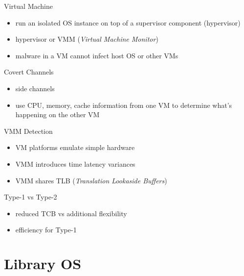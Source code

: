 \documentclass{curs}
\begin{document}
\begin{frame}{Virtual Machine}
  \begin{itemize}
    \item run an isolated OS instance on top of a supervisor component (hypervisor)
    \item hypervisor or VMM (\textit{Virtual Machine Monitor})
    \item malware in a VM cannot infect host OS or other VMs
  \end{itemize}
\end{frame}

\begin{frame}{Covert Channels}
  \begin{itemize}
    \item side channels
    \item use CPU, memory, cache information from one VM to determine what's happening on the other VM
  \end{itemize}
\end{frame}

\begin{frame}{VMM Detection}
  \begin{itemize}
    \item VM platforms emulate simple hardware
    \item VMM introduces time latency variances
    \item VMM shares TLB (\textit{Translation Lookaside Buffers})
  \end{itemize}
\end{frame}

\begin{frame}{Type-1 vs Type-2}
  \begin{itemize}
    \item reduced TCB vs additional flexibility
    \item efficiency for Type-1
  \end{itemize}
\end{frame}
\section{Library OS}
\end{document}
